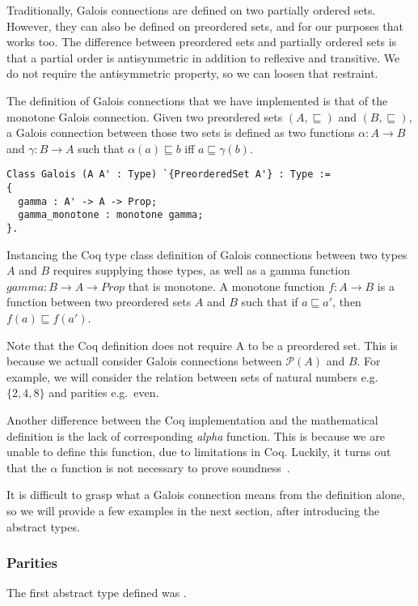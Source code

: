 Traditionally, Galois connections are defined on two partially ordered sets.
However, they can also be defined on preordered sets, and for our purposes that
works too. 
The difference between preordered sets and partially ordered sets is
that a partial order is antisymmetric in addition to reflexive and transitive.
We do not require the antisymmetric property, so we can loosen that restraint.

The definition of Galois connections that we have implemented is that of the
monotone Galois connection. Given two preordered sets $(A,\sqsubseteq)$ and
$(B,\sqsubseteq)$, a Galois connection between those two sets is defined as two
functions $\alpha : A \rightarrow B$ and $\gamma : B \rightarrow A$ such 
that $\alpha(a)
\sqsubseteq b$ iff $a \sqsubseteq \gamma(b)$.

\begin{verbatim}
Class Galois (A A' : Type) `{PreorderedSet A'} : Type :=
{
  gamma : A' -> A -> Prop;
  gamma_monotone : monotone gamma;
}.
\end{verbatim}

Instancing the Coq type class definition of Galois connections between two
types $A$ and $B$ requires supplying those types, as well as a gamma function
$gamma : B \rightarrow A \rightarrow Prop$ that is monotone. 
A monotone function $f : A \rightarrow B$ is
a function between two preordered sets $A$ and $B$ such that if $a \sqsubseteq
a'$, then $f(a) \sqsubseteq f(a')$.

Note that the Coq definition does not require A to be a preordered set. This is
because we actuall consider Galois connections between $\mathcal{P}(A)$ and
$B$. For example, we will consider the relation between sets of natural numbers
e.g.\ $\{2, 4, 8\}$ and parities e.g.\ even.

Another difference between the Coq implementation and the mathematical
definition is the lack of corresponding \textit{alpha} function. This is
because we are unable to define this function, due to limitations in Coq.
Luckily, it turns out that the $\alpha$ function is not necessary to prove
soundness~\cite{jourdan2016verasco}.

It is difficult to grasp what a Galois connection means from the definition
alone, so we will provide a few examples in the next section, after
introducing the abstract types.

\subsubsection{Parities}
The first abstract type defined was .

